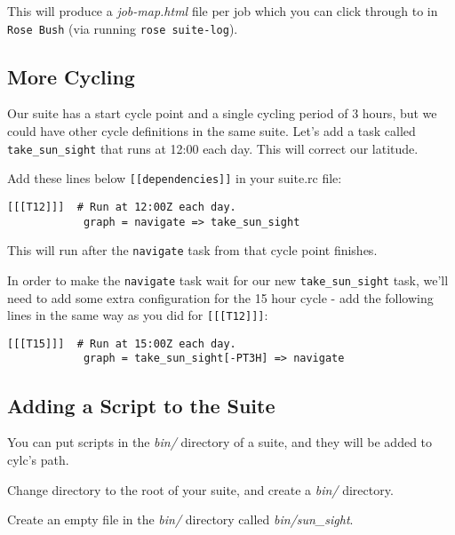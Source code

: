 
This will produce a {\em job-map.html} file per job which you can click through to in \lstinline{Rose Bush} (via running \lstinline{rose suite-log}).

\subsection{More Cycling}

Our suite has a start cycle point and a single cycling period of 3 hours, but we could have other cycle definitions in the same suite. Let's add a task called \lstinline{take_sun_sight} that runs at 12:00 each day. This will correct our latitude.

Add these lines below \lstinline{[[dependencies]]} in your suite.rc file:

\lstset{language=suiterc}
\begin{lstlisting}[columns=fullflexible]
        [[[T12]]]  # Run at 12:00Z each day.
            graph = navigate => take_sun_sight
\end{lstlisting}

This will run after the \lstinline{navigate} task from that cycle point finishes.

In order to make the \lstinline{navigate} task wait for our new \lstinline{take_sun_sight} task, we'll need to add some extra configuration for the 15 hour cycle - add the following lines in the same way as you did for \lstinline{[[[T12]]]}:

\lstset{language=suiterc}
\begin{lstlisting}[columns=fullflexible]
        [[[T15]]]  # Run at 15:00Z each day.
            graph = take_sun_sight[-PT3H] => navigate
\end{lstlisting}


\subsection{Adding a Script to the Suite}

You can put scripts in the {\em bin/} directory of a suite, and they will be added to cylc's path.

Change directory to the root of your suite, and create a {\em bin/} directory.

Create an empty file in the {\em bin/} directory called {\em bin/sun\_sight}.


